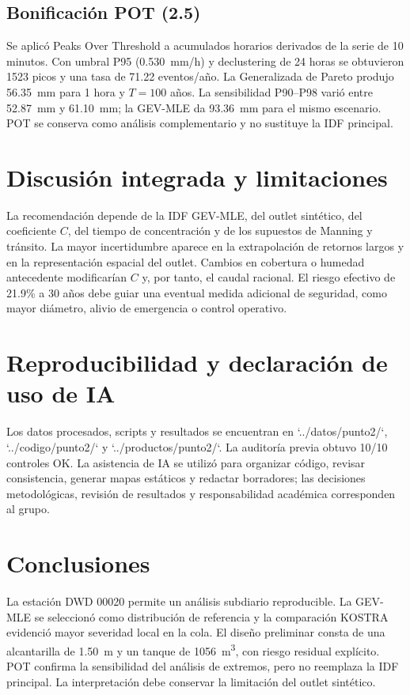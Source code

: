 \documentclass[man]{apa7}
\begin{document}
\subsection{Bonificación POT (2.5)}
Se aplicó Peaks Over Threshold a acumulados horarios derivados de la serie de 10 minutos. Con umbral P95 (\SI{0.530}{mm/h}) y declustering de 24 horas se obtuvieron 1523 picos y una tasa de 71.22 eventos/año. La Generalizada de Pareto produjo \SI{56.35}{mm} para 1 hora y $T=100$ años. La sensibilidad P90--P98 varió entre \SI{52.87}{mm} y \SI{61.10}{mm}; la GEV-MLE da \SI{93.36}{mm} para el mismo escenario. POT se conserva como análisis complementario y no sustituye la IDF principal.

\section{Discusión integrada y limitaciones}
La recomendación depende de la IDF GEV-MLE, del outlet sintético, del coeficiente $C$, del tiempo de concentración y de los supuestos de Manning y tránsito. La mayor incertidumbre aparece en la extrapolación de retornos largos y en la representación espacial del outlet. Cambios en cobertura o humedad antecedente modificarían $C$ y, por tanto, el caudal racional. El riesgo efectivo de 21.9\% a 30 años debe guiar una eventual medida adicional de seguridad, como mayor diámetro, alivio de emergencia o control operativo.

\section{Reproducibilidad y declaración de uso de IA}
Los datos procesados, scripts y resultados se encuentran en `../datos/punto2/`, `../codigo/punto2/` y `../productos/punto2/`. La auditoría previa obtuvo 10/10 controles OK. La asistencia de IA se utilizó para organizar código, revisar consistencia, generar mapas estáticos y redactar borradores; las decisiones metodológicas, revisión de resultados y responsabilidad académica corresponden al grupo.

\section{Conclusiones}
La estación DWD 00020 permite un análisis subdiario reproducible. La GEV-MLE se seleccionó como distribución de referencia y la comparación KOSTRA evidenció mayor severidad local en la cola. El diseño preliminar consta de una alcantarilla de \SI{1.50}{m} y un tanque de \SI{1056}{m^3}, con riesgo residual explícito. POT confirma la sensibilidad del análisis de extremos, pero no reemplaza la IDF principal. La interpretación debe conservar la limitación del outlet sintético.
\end{document}
